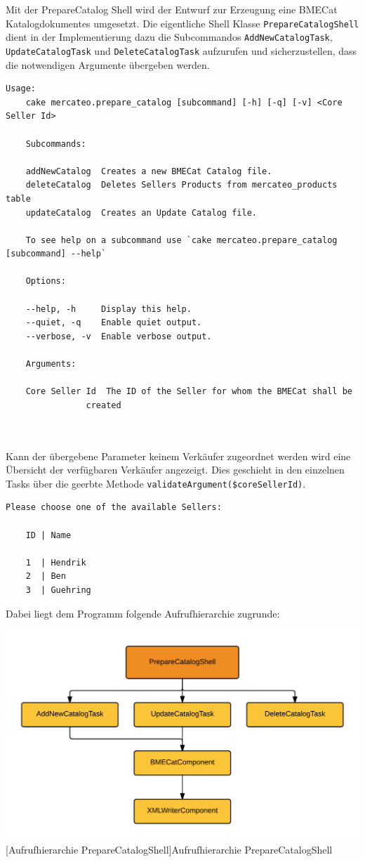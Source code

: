 	Mit der PrepareCatalog Shell wird der Entwurf zur Erzeugung eine BMECat Katalogdokumentes umgesetzt. Die eigentliche Shell Klasse \texttt{PrepareCatalogShell} dient in der Implementierung  dazu die Subcommandos \texttt{AddNewCatalogTask}, \texttt{UpdateCatalogTask} und \texttt{DeleteCatalogTask} aufzurufen und sicherzustellen, dass die notwendigen Argumente übergeben werden.
	\lstset{basicstyle=\scriptsize\ttfamily}
	\begin{lstlisting}[caption={Konsolenausgabe bei Aufruf der PrepareCatalogShell}]
	Usage:
	cake mercateo.prepare_catalog [subcommand] [-h] [-q] [-v] <Core Seller Id>
	
	Subcommands:
	
	addNewCatalog  Creates a new BMECat Catalog file.
	deleteCatalog  Deletes Sellers Products from mercateo_products table
	updateCatalog  Creates an Update Catalog file.
	
	To see help on a subcommand use `cake mercateo.prepare_catalog [subcommand] --help`
	
	Options:
	
	--help, -h     Display this help.
	--quiet, -q    Enable quiet output.
	--verbose, -v  Enable verbose output.
	
	Arguments:
	
	Core Seller Id  The ID of the Seller for whom the BMECat shall be
	            created

	
	\end{lstlisting}
	
	Kann der übergebene Parameter keinem Verkäufer zugeordnet werden wird eine Übersicht der verfügbaren Verkäufer angezeigt. Dies geschieht in den einzelnen Tasks über die geerbte Methode \texttt{validateArgument(\$coreSellerId)}.
	
	\begin{lstlisting}[caption={Auflistung der verfügbaren Verkäufer}]
	Please choose one of the available Sellers:
	
	ID | Name
	
	1  | Hendrik
	2  | Ben
	3  | Guehring
	\end{lstlisting}
	
	Dabei liegt dem Programm folgende Aufrufhierarchie zugrunde:\\
	\begin{minipage}{\linewidth}
		\vspace{1em}
		\centering
		\includegraphics[width=0.7 \linewidth]{img/Aufrufhierarchie}
		[Aufrufhierarchie PrepareCatalogShell]{Aufrufhierarchie PrepareCatalogShell}
		\vspace{1em}
	\end{minipage}\\
	
